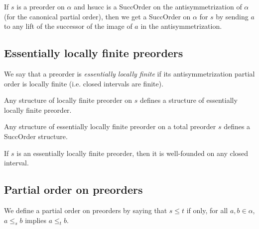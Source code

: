 \begin{subdefi}[SuccOrderofAntisymmetrization]
If $s$ is a preorder on $\alpha$ and hsucc is a SuccOrder on the antisymmetrization of $\alpha$ (for the canonical partial order), then we get
a SuccOrder on $\alpha$ for $s$ by sending $a$ to any lift of the successor of the image of $a$ in the antisymmetrization.

\end{subdefi}


\subsection{Essentially locally finite preorders}

\begin{subdefi}[EssentiallyLocallyFinitePreorder]
We say that a preorder is \emph{essentially locally finite} if its antisymmetrization partial order is locally finite (i.e. closed intervals are finite).

\end{subdefi}

\begin{subdefi}
Any structure of locally finite preorder on $s$ defines a structure of essentially locally finite preorder.

\end{subdefi}

\begin{subdefi}
Any structure of essentially locally finite preorder on a total preorder $s$ defines a SuccOrder structure.

\end{subdefi}

\begin{sublemma}
If $s$ is an essentially locally finite preorder, then it is well-founded on any closed interval.

\end{sublemma}

\subsection{Partial order on preorders}

\begin{subdefi}
We define a partial order on preorders by saying that $s \le t$ if only, for all $a,b\in\alpha$, $a \le_s b$ implies $a\le_t b$.

\end{subdefi}


